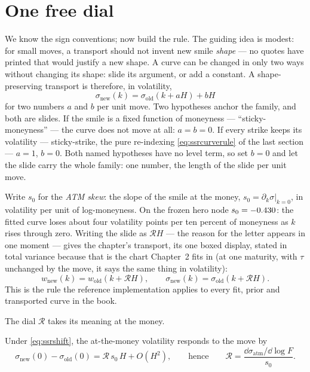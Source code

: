 \section{One free dial}
\label{sec:ssrdial}

We know the sign conventions; now build the rule.  The guiding idea is
modest: for small moves, a transport should not invent new smile
\emph{shape} --- no quotes have printed that would justify a new
shape.  A curve can be changed in only two ways without changing its
shape: slide its argument, or add a constant.  A shape-preserving
transport is therefore, in volatility,
\[
\sigma_{\mathrm{new}}(k)
=\sigma_{\mathrm{old}}(k+aH)+bH
\]
for two numbers $a$ and $b$ per unit move.  Two hypotheses anchor the
family, and both are slides.  If the smile is a fixed function of
moneyness --- ``sticky-moneyness'' --- the curve does not move at all:
$a=b=0$.  If every strike keeps its volatility --- sticky-strike, the
pure re-indexing \eqref{eq:ssrcurverule} of the last section ---
$a=1$, $b=0$.  Both named hypotheses have no level term, so set $b=0$
and let the slide carry the whole family: one number, the length of
the slide per unit move.

Write $s_0$ for the \emph{ATM skew}: the slope of the smile at the
money, $s_0=\partial_k\sigma|_{k=0}$, in volatility per unit of
log-moneyness.  On the frozen hero node $s_0=-0.430$: the
fitted curve loses about four volatility points per ten percent of
moneyness as $k$ rises through zero.  Writing the slide as
$\mathcal{R}H$ --- the reason for the letter appears in one moment ---
gives the chapter's transport, its one boxed display, stated in
total variance because that is the chart Chapter~2 fits in (at one
maturity, with $\tau$ unchanged by the move, it says the same thing
in volatility):
\begin{equation}
\boxed{\;w_{\mathrm{new}}(k)=w_{\mathrm{old}}(k+\mathcal{R}H),
\qquad
\sigma_{\mathrm{new}}(k)=\sigma_{\mathrm{old}}(k+\mathcal{R}H) .\;}
\label{eq:ssrshift}
\end{equation}
This is the rule the reference implementation applies to every fit,
prior and transported curve in the book.

The dial $\mathcal{R}$ takes its meaning at the money.

\begin{proposition}
\label{prop:ssratm}
Under \eqref{eq:ssrshift}, the at-the-money volatility responds to the
move by
\[
\sigma_{\mathrm{new}}(0)-\sigma_{\mathrm{old}}(0)
=\mathcal{R}\,s_0\,H+O(H^{2}) ,
\qquad\text{hence}\qquad
\mathcal{R}
=\frac{\dd\sigma_{\mathrm{atm}}/\dd\log F}{s_0} .
\]
\end{proposition}

